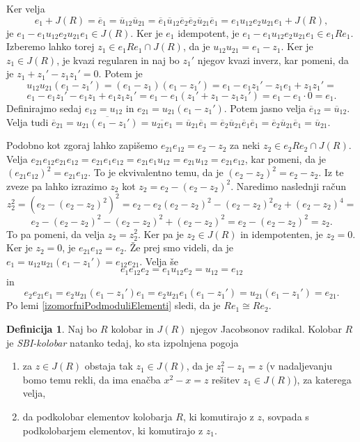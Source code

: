 \documentclass[a4paper, 12pt]{amsart}
\theoremstyle{definition} %
\newtheorem{definicija}{Definicija}[section]
\theoremstyle{plain} %
\begin{document}
Ker velja 
$$
e_1 + J(R) = \overline{e}_1 = \overline{u}_{12} \overline{u}_{21} = \overline{e}_1 \overline{u}_{12} \overline{e}_2 \overline{e}_2 \overline{u}_{21} \overline{e}_1 = e_1 u_{12} e_2 u_{21} e_1 + J(R),
$$
je $e_1 - e_1 u_{12} e_2 u_{21} e_1 \in J(R)$. Ker je $e_1$ idempotent, je  $e_1 - e_1 u_{12} e_2 u_{21} e_1 \in e_1 R e_1$. Izberemo lahko torej $z_1 \in e_1Re_1 \cap J(R)$, da je $u_{12}u_{21} = e_1 - z_1$. Ker je $z_1\in J(R)$, je kvazi regularen in naj bo $z_1'$ njegov kvazi inverz, kar pomeni, da je $z_1 + z_1' - z_1 z_1' = 0$. Potem je 
$$
u_{12} u_{21} (e_1 - z_1') = (e_1 - z_1)(e_1 - z_1') = e_1 - e_1 z_1' - z_1 e_1 + z_1 z_1' = 
$$
$$
e_1 - e_1 z_1' - e_1 z_1 + e_1 z_1 z_1' = e_1 - e_1 (z_1' +z_1 - z_1 z_1') = e_1  - e_1 \cdot 0 = e_1.
$$
Definirajmo sedaj $e_{12} = u_{12} $ in $e_{21} = u_{21} (e_1 - z_1')$. Potem jasno velja $\overline{e}_{12} = \overline{u}_{12}$. Velja tudi $\overline{e}_{21} = \overline{u_{21}(e_1 - z_1')} = \overline{u_{21} e_1} = \overline{u}_{21} \overline{e}_1 = \overline{e}_2 \overline{u}_{21} \overline{e}_1 \overline{e}_1 =  \overline{e}_2 \overline{u}_{21} \overline{e}_1 = \overline{u}_{21}$.

Podobno kot zgoraj lahko zapišemo $e_{21} e_{12} = e_2 - z_2 $ za neki $z_2 \in e_2 Re_2 \cap J(R)$. Velja $e_{21}e_{12}e_{21}e_{12} = e_{21} e_1 e_{12} = e_{21} e_1 u_{12} = e_{21} u_{12} = e_{21} e_{12}$, kar pomeni, da je $(e_{21} e_{12})^2 = e_{21} e_{12}$. To je ekvivalentno temu, da je $(e_2 - z_2 )^2 = e_2 - z_2$. Iz te zveze pa lahko izrazimo $z_2$ kot $z_2 = e_2 - (e_2 - z_2)^2$. Naredimo naslednji račun
$$
z_2^2 = (e_2 - (e_2 - z_2)^2)^2 = e_2 - e_2(e_2-z_2)^2 - (e_2 - z_2 )^2 e_2 + (e_2 - z_2 )^4 = 
$$
$$
e_2 - (e_2 - z_2 )^2 - (e_2 - z_2)^2 + (e_2 - z_2)^2 = e_2 - (e_2 - z_2)^2 = z_2.
$$
To pa pomeni, da velja $z_2 = z_2^2$. Ker pa je $z_2\in J(R)$ in idempotenten, je $z_2 = 0$. Ker je $z_2 = 0$, je $e_{21} e_{12} = e_2$. Že prej smo videli, da je $e_1 = u_{12}u_{21}(e_1 - z_1') = e_{12} e_{21}$. Velja še 
$$
e_1 e_{12}e_2 = e_1 u_{12} e_2 = u_{12} = e_{12}
$$
in
$$
e_2 e_{21} e_1 = e_2 u_{21}(e_1 - z_1') e_1 = e_2 u_{21} e_1 (e_1 - z_1') = u_{21}(e_1 - z_1') = e_{21}.
$$
Po lemi \ref{izomorfniPodmoduliElementi} sledi, da je $Re_1 \cong Re_2$.

\endproof

\begin{definicija}
\label{SBI-kolobar}
Naj bo $R$ kolobar in $J(R)$ njegov Jacobsonov radikal. Kolobar $R$ je \emph{SBI-kolobar} natanko tedaj, ko sta izpolnjena pogoja
\begin{enumerate}
\item za $z\in J(R)$ obstaja tak $z_1 \in J(R)$, da je $z_1^2 - z_1 = z$ (v nadaljevanju bomo temu rekli, da ima enačba $x^2 - x = z$ rešitev $z_1 \in J(R)$), za katerega velja, 
\item da podkolobar elementov kolobarja $R$, ki komutirajo z $z$, sovpada s podkolobarjem elementov, ki komutirajo z $z_1$.  
\end{enumerate}
\end{definicija}
\end{document}
